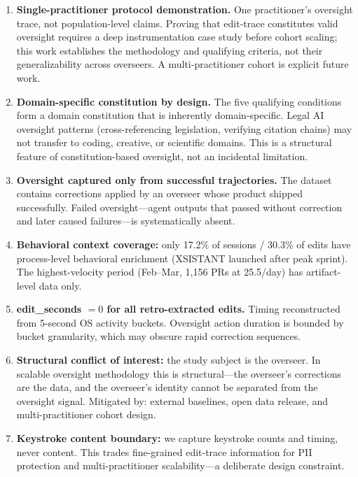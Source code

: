 \documentclass[11pt]{article}
\begin{document}
\begin{enumerate}[label=(\roman*),leftmargin=2.5em]

\item \textbf{Single-practitioner protocol demonstration.}
One practitioner's oversight trace, not population-level claims.
Proving that edit-trace constitutes valid oversight requires a deep instrumentation case study before cohort scaling; this work establishes the methodology and qualifying criteria, not their generalizability across overseers.
A multi-practitioner cohort is explicit future work.

\item \textbf{Domain-specific constitution by design.}
The five qualifying conditions form a domain constitution that is inherently domain-specific.
Legal AI oversight patterns (cross-referencing legislation, verifying citation chains) may not transfer to coding, creative, or scientific domains.
This is a structural feature of constitution-based oversight, not an incidental limitation.

\item \textbf{Oversight captured only from successful trajectories.}
The dataset contains corrections applied by an overseer whose product shipped successfully.
Failed oversight---agent outputs that passed without correction and later caused failures---is systematically absent.

\item \textbf{Behavioral context coverage:} only 17.2\% of sessions / 30.3\% of edits have process-level behavioral enrichment (XSISTANT launched after peak sprint).
The highest-velocity period (Feb--Mar, 1{,}156 PRs at 25.5/day) has artifact-level data only.

\item \textbf{edit\_seconds $= 0$ for all retro-extracted edits.}
Timing reconstructed from 5-second OS activity buckets.
Oversight action duration is bounded by bucket granularity, which may obscure rapid correction sequences.

\item \textbf{Structural conflict of interest:} the study subject is the overseer.
In scalable oversight methodology this is structural---the overseer's corrections are the data, and the overseer's identity cannot be separated from the oversight signal.
Mitigated by: external baselines, open data release, and multi-practitioner cohort design.

\item \textbf{Keystroke content boundary:} we capture keystroke counts and timing, never content.
This trades fine-grained edit-trace information for PII protection and multi-practitioner scalability---a deliberate design constraint.

\end{enumerate}
\end{document}
